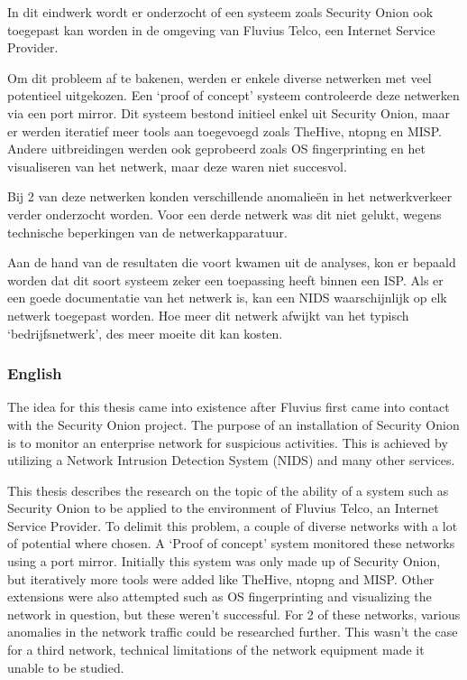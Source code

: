 \documentclass[a4paper, 12pt]{report}
\begin{document}
In dit eindwerk wordt er onderzocht of een systeem zoals Security Onion ook toegepast kan worden in de omgeving van Fluvius Telco, een Internet Service Provider.

Om dit probleem af te bakenen, werden er enkele diverse netwerken met veel potentieel uitgekozen.
Een `proof of concept' systeem controleerde deze netwerken via een port mirror.
Dit systeem bestond initieel enkel uit Security Onion, maar er werden iteratief meer tools aan toegevoegd zoals TheHive, ntopng en MISP.
Andere uitbreidingen werden ook geprobeerd zoals OS fingerprinting en het visualiseren van het netwerk, maar deze waren niet succesvol.

Bij 2 van deze netwerken konden verschillende anomalieën in het netwerkverkeer verder onderzocht worden.
Voor een derde netwerk was dit niet gelukt, wegens technische beperkingen van de netwerkapparatuur.

Aan de hand van de resultaten die voort kwamen uit de analyses, kon er bepaald worden dat dit soort systeem zeker een toepassing heeft binnen een ISP.
Als er een goede documentatie van het netwerk is, kan een NIDS waarschijnlijk op elk netwerk toegepast worden.
Hoe meer dit netwerk afwijkt van het typisch `bedrijfsnetwerk', des meer moeite dit kan kosten.

\newpage
\subsubsection{English}
The idea for this thesis came into existence after Fluvius first came into contact with the Security Onion project.
The purpose of an installation of Security Onion is to monitor an enterprise network for suspicious activities.
This is achieved by utilizing a Network Intrusion Detection System (NIDS) and many other services.

This thesis describes the research on the topic of the ability of a system such as Security Onion to be applied to the environment of Fluvius Telco, an Internet Service Provider.
To delimit this problem, a couple of diverse networks with a lot of potential where chosen.
A `Proof of concept' system monitored these networks using a port mirror.
Initially this system was only made up of Security Onion, but iteratively more tools were added like TheHive, ntopng and MISP.
Other extensions were also attempted such as OS fingerprinting and visualizing the network in question, but these weren't successful.
For 2 of these networks, various anomalies in the network traffic could be researched further.
This wasn't the case for a third network, technical limitations of the network equipment made it unable to be studied.
\end{document}
